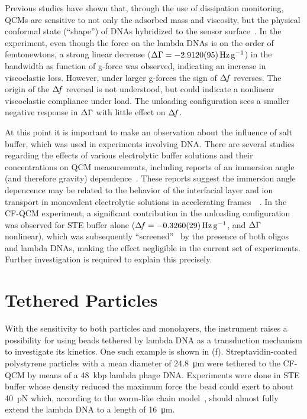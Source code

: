 Previous studies have shown that, through the use of dissipation
monitoring, QCMs are sensitive to not only the adsorbed mass and viscosity,
but the physical conformal state (``shape'') of DNAs hybridized to the
sensor surface~\cite{tsortos2008shear}.  In the experiment, even though the
force on the lambda DNAs is on the order of femtonewtons, a strong linear
decrease ($\dg=\SI{-2.912+-0.0095}{\hertz\per\g}$) in the bandwidth as
function of g-force was observed, indicating an increase in viscoelastic
loss.  However, under larger g-forces the sign of $\Delta\!f$ reverses.  The
origin of the $\Delta\!f$ reversal is not understood, but could indicate a
nonlinear viscoelastic compliance under load.  The unloading configuration
sees a smaller negative response in $\Delta\Gamma$ with little effect on $\Delta\!f$.

At this point it is important to make an observation about the influence of
salt buffer, which was used in experiments involving DNA\@.  There are
several studies~\cite{encarnaccao2007influence}~\cite{lin1995role}
regarding the effects of various electrolytic buffer solutions and their
concentrations on QCM measurements, including reports of an immersion angle
(and therefore gravity) dependence~\cite{yoshimoto2006characteristics}.
These reports suggest the immersion angle depencence may be related to the
behavior of the interfacial layer and ion transport in monovalent
electrolytic solutions in accelerating
frames~\cite{tolman1911electromotive}~\cite{des1893unpolarisirbare}.  In
the CF-QCM experiment, a significant contribution in the unloading
configuration was observed for STE buffer alone
($\df=\SI{-0.326+-0.0029}{\hertz\per\g}$, and $\Delta\Gamma$ nonlinear), which was
subsequently ``screened''~\cite{zhang2002insulating} by the presence of
both oligos and lambda DNAs, making the effect negligible in the current
set of experiments.  Further investigation is required to explain this
precisely.

\section{Tethered Particles}
With the sensitivity to both particles and monolayers, the instrument
raises a possibility for using beads tethered by lambda DNA as a
transduction mechanism to investigate its kinetics.  One such example is
shown in (f).  Streptavidin-coated polystyrene
particles with a mean diameter of \SI{24.8}{\micro\meter} were tethered to
the CF-QCM by means of a \SI{48}{kbp} lambda phage DNA\@.  Experiments were
done in STE buffer whose density reduced the maximum force the bead could
exert to about \SI{40}{\pico\newton} which, according to the worm-like
chain model~\cite{marko1995stretching}, should almost fully extend the
lambda DNA to a length of \SI{16}{\micro\meter}.

